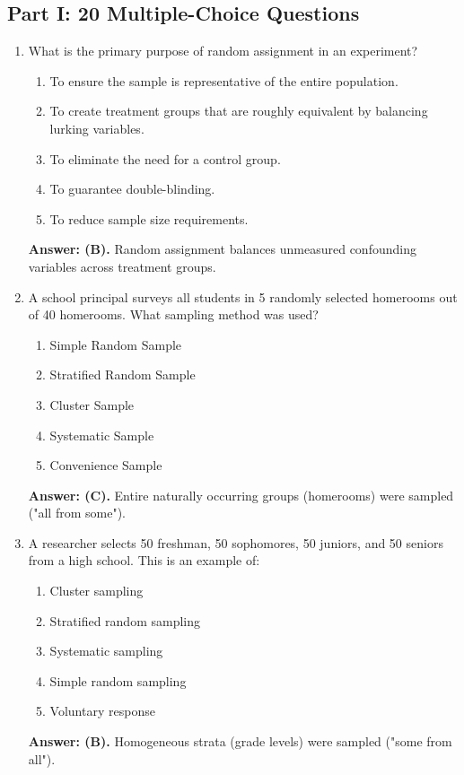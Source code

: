 \subsection*{Part I: 20 Multiple-Choice Questions}

\begin{enumerate}[leftmargin=1.5em]
  \item What is the primary purpose of random assignment in an experiment?
  \begin{enumerate}[label=(\Alph*)]
    \item To ensure the sample is representative of the entire population.
    \item To create treatment groups that are roughly equivalent by balancing lurking variables.
    \item To eliminate the need for a control group.
    \item To guarantee double-blinding.
    \item To reduce sample size requirements.
  \end{enumerate}
  \textbf{Answer: (B).} Random assignment balances unmeasured confounding variables across treatment groups.

  \item A school principal surveys all students in 5 randomly selected homerooms out of 40 homerooms. What sampling method was used?
  \begin{enumerate}[label=(\Alph*)]
    \item Simple Random Sample \item Stratified Random Sample \item Cluster Sample \item Systematic Sample \item Convenience Sample
  \end{enumerate}
  \textbf{Answer: (C).} Entire naturally occurring groups (homerooms) were sampled ("all from some").

  \item A researcher selects 50 freshman, 50 sophomores, 50 juniors, and 50 seniors from a high school. This is an example of:
  \begin{enumerate}[label=(\Alph*)]
    \item Cluster sampling \item Stratified random sampling \item Systematic sampling \item Simple random sampling \item Voluntary response
  \end{enumerate}
  \textbf{Answer: (B).} Homogeneous strata (grade levels) were sampled ("some from all").


\end{enumerate}
